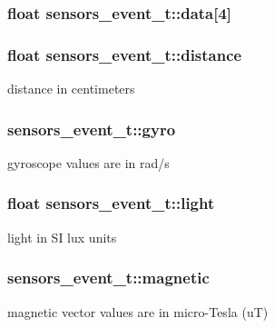\subsubsection[{\texorpdfstring{data}{data}}]{\setlength{\rightskip}{0pt plus 5cm}float sensors\+\_\+event\+\_\+t\+::data\mbox{[}4\mbox{]}}\hypertarget{structsensors__event__t_addee33a715123e16eb463e5cc9024fe2}{}\label{structsensors__event__t_addee33a715123e16eb463e5cc9024fe2}
\subsubsection[{\texorpdfstring{distance}{distance}}]{\setlength{\rightskip}{0pt plus 5cm}float sensors\+\_\+event\+\_\+t\+::distance}\hypertarget{structsensors__event__t_a456259aaeb265913281d7ffbd8ad8697}{}\label{structsensors__event__t_a456259aaeb265913281d7ffbd8ad8697}
distance in centimeters 
\subsubsection[{\texorpdfstring{gyro}{gyro}}]{ sensors\+\_\+event\+\_\+t\+::gyro}\hypertarget{structsensors__event__t_ad108ea8c3a18d02cfc674ba27e94a2c4}{}\label{structsensors__event__t_ad108ea8c3a18d02cfc674ba27e94a2c4}
gyroscope values are in rad/s 
\subsubsection[{\texorpdfstring{light}{light}}]{\setlength{\rightskip}{0pt plus 5cm}float sensors\+\_\+event\+\_\+t\+::light}\hypertarget{structsensors__event__t_adefd2ce2da44e4449ef7cadeaecc6cfd}{}\label{structsensors__event__t_adefd2ce2da44e4449ef7cadeaecc6cfd}
light in SI lux units 
\subsubsection[{\texorpdfstring{magnetic}{magnetic}}]{ sensors\+\_\+event\+\_\+t\+::magnetic}\hypertarget{structsensors__event__t_aa634d41a024e1cacdceecf85ec326698}{}\label{structsensors__event__t_aa634d41a024e1cacdceecf85ec326698}
magnetic vector values are in micro-\/\+Tesla (uT) 
